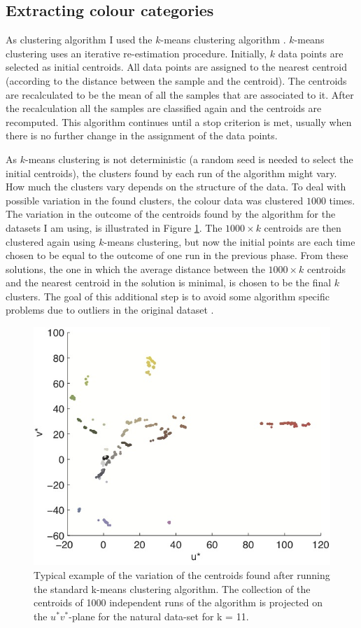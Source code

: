 \subsection{Extracting colour categories}

As clustering algorithm I used the $k$-means clustering algorithm
\citep{lloyd82least}. $k$-means clustering uses an iterative
re-estimation procedure. Initially, $k$ data points are selected as
initial centroids. All data points are assigned to the nearest
centroid (according to the distance between the sample and the
centroid). The centroids are recalculated to be the mean of all the
samples that are associated to it.  After the recalculation all the
samples are classified again and the centroids are recomputed. This
algorithm continues until a stop criterion is met, usually when there
is no further change in the assignment of the data points.

As $k$-means clustering is not deterministic (a random seed is needed
to select the initial centroids), the clusters found by each run of
the algorithm might vary. How much the clusters vary depends on the
structure of the data. To deal with possible variation in the found
clusters, the colour data was clustered $1000$ times. The variation in
the outcome of the centroids found by the algorithm for the datasets I
am using, is illustrated in Figure \ref{f:clustering-first}. The $1000
\times k$ centroids are then clustered again using $k$-means
clustering, but now the initial points are each time chosen to be
equal to the outcome of one run in the previous phase. From these
solutions, the one in which the average distance between the $1000
\times k$ centroids and the nearest centroid in the solution is
minimal, is chosen to be the final $k$ clusters. The goal of this
additional step is to avoid some algorithm specific problems due to
outliers in the original dataset \citep{bradley98refining}.

\begin{figure}[htbp]
\centering
\includegraphics[width=.7\textwidth]{./experiments/figures/clustering-first.jpg}
\caption[Example of the variation of the centroids found by the
k-means clustering algorithm]{Typical example of the variation of the
  centroids found after running the standard k-means clustering
  algorithm. The collection of the centroids of 1000 independent runs
  of the algorithm is projected on the $u^*v^*$-plane for the natural
  data-set for k = 11.}
\label{f:clustering-first}
\end{figure}

